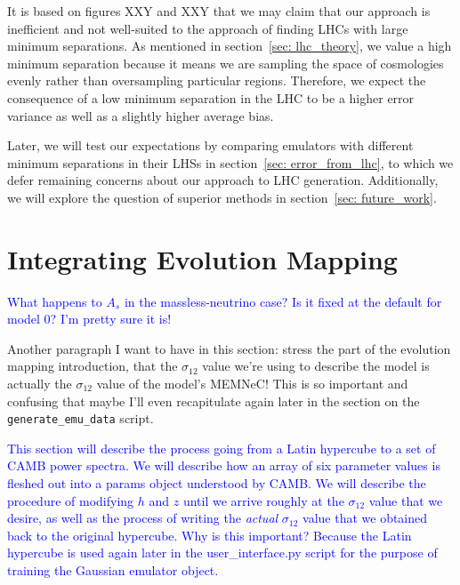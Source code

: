 It is based on figures XXY and XXY that we may claim that our approach is
inefficient and not well-suited to the approach of finding LHCs with large
minimum separations. As mentioned in section~\ref{sec: lhc_theory},
we value a high minimum separation because it means we are sampling the
space of cosmologies evenly rather than oversampling particular regions.
Therefore, we expect the consequence of a low minimum separation in the LHC to
be a higher error variance as well as a slightly higher average bias.


Later, we will test our expectations by comparing emulators with different
minimum separations in their LHSs in section~\ref{sec: error_from_lhc}, to
which we defer remaining concerns about our approach to LHC generation.
Additionally, we will explore the question of superior methods in
section~\ref{sec: future_work}.

\section{Integrating Evolution Mapping}
\label{sec: generate_emu_data}

\textcolor{blue}{What happens to $A_s$ in the massless-neutrino case? Is it 
fixed at the default for model 0? I'm pretty sure it is!}

Another paragraph I want to have in this section: stress the part of the 
evolution mapping introduction, that the $\sigma_{12}$ value we're using to 
describe the model is actually the $\sigma_{12}$ value of the model's MEMNeC! 
This is so important and confusing that maybe I'll even recapitulate again 
later in the section on the \verb|generate_emu_data| script.


\textcolor{blue}{This section will describe the process going from a Latin 
hypercube to a set of CAMB power spectra. We will describe how an array of six 
parameter values is fleshed out into a params object understood by CAMB. We 
will describe the procedure of modifying $h$ and $z$ until we arrive roughly 
at the $\sigma_{12}$ value that we desire, as well as the process of writing 
the \textit{actual} $\sigma_{12}$ value that we obtained back to the original 
hypercube. Why is this important? Because the Latin hypercube is used again 
later in the user\_interface.py script for the purpose of training the 
Gaussian emulator object.}


